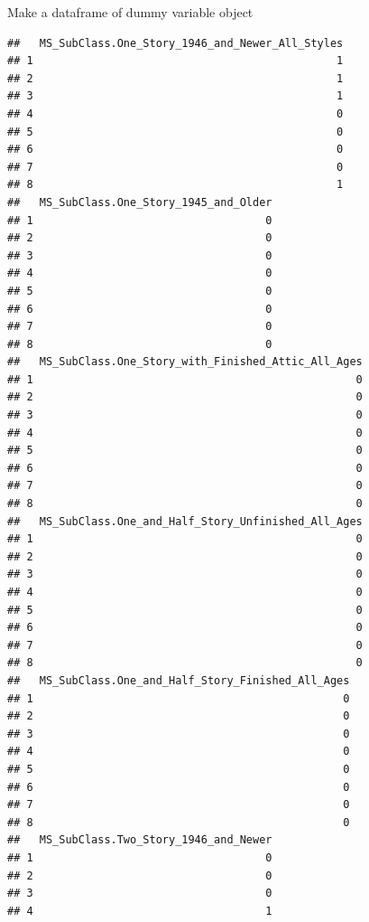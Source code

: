 \documentclass[
  10pt,
  ignorenonframetext,
]{beamer}
\begin{document}
\begin{frame}[fragile]{Make a dataframe of dummy variable object}
\begin{verbatim}
##   MS_SubClass.One_Story_1946_and_Newer_All_Styles
## 1                                               1
## 2                                               1
## 3                                               1
## 4                                               0
## 5                                               0
## 6                                               0
## 7                                               0
## 8                                               1
##   MS_SubClass.One_Story_1945_and_Older
## 1                                    0
## 2                                    0
## 3                                    0
## 4                                    0
## 5                                    0
## 6                                    0
## 7                                    0
## 8                                    0
##   MS_SubClass.One_Story_with_Finished_Attic_All_Ages
## 1                                                  0
## 2                                                  0
## 3                                                  0
## 4                                                  0
## 5                                                  0
## 6                                                  0
## 7                                                  0
## 8                                                  0
##   MS_SubClass.One_and_Half_Story_Unfinished_All_Ages
## 1                                                  0
## 2                                                  0
## 3                                                  0
## 4                                                  0
## 5                                                  0
## 6                                                  0
## 7                                                  0
## 8                                                  0
##   MS_SubClass.One_and_Half_Story_Finished_All_Ages
## 1                                                0
## 2                                                0
## 3                                                0
## 4                                                0
## 5                                                0
## 6                                                0
## 7                                                0
## 8                                                0
##   MS_SubClass.Two_Story_1946_and_Newer
## 1                                    0
## 2                                    0
## 3                                    0
## 4                                    1

\end{verbatim}
\end{frame}
\end{document}
